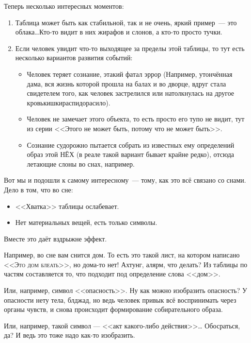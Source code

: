 \documentclass[a4paper,14pt,oneside]{memoir}
\begin{document}
Теперь несколько интересных моментов:
\begin{enumerate}
\item Таблица может быть как стабильной, так и не очень, яркий пример~--- это облака\ldots Кто-то видит в них жирафов и слонов, а кто-то просто тучки. 
\item Если человек увидит что-то выходящее за пределы этой таблицы, то тут есть несколько вариантов развития событий:
\begin{itemize}
\item Человек теряет сознание, этакий фатал эррор (Например, утончённая дама, вся жизнь которой прошла на балах и во дворце, вдруг стала свидетелем того, как человек застрелился или натолкнулась на другое кровькишкираспидорасило).
\item Человек не замечает этого объекта, то есть просто его тупо не видит, тут из серии <<Этого не может быть, потому что не может быть>>.
\item Сознание судорожно пытается собрать из известных ему определений образ этой НЁХ (в реале такой вариант бывает крайне редко), отсюда летающие слоны во снах, например.
\end{itemize}
\end{enumerate}

Вот мы и подошли к самому интересному~--- тому, как это всё связано со снами. Дело в том, что во сне:
\begin {itemize}
\item <<Хватка>> таблицы ослабевает. 
\item Нет материальных вещей, есть только символы.
\end{itemize}

Вместе это даёт вздрыжне эффект.
 
Например, во сне вам снится дом. То есть это такой лист, на котором написано <<\textsc{Это дом блеать}>>, но дома-то нет! Ахтунг, алярм, что делать? Из таблицы по частям составляется то, что подходит под определение слова <<дом>>. 

Или, например, символ <<опасность>>. Ну как можно изобразить опасность? У опасности нету тела, блджад, но ведь человек привык всё воспринимать через органы чувств, и снова происходит формирование собирательного образа. 

Или, например, такой символ — <<акт какого-либо действия>>… Обосраться, да? И ведь это тоже надо как-то изобразить. 
\end{document}
